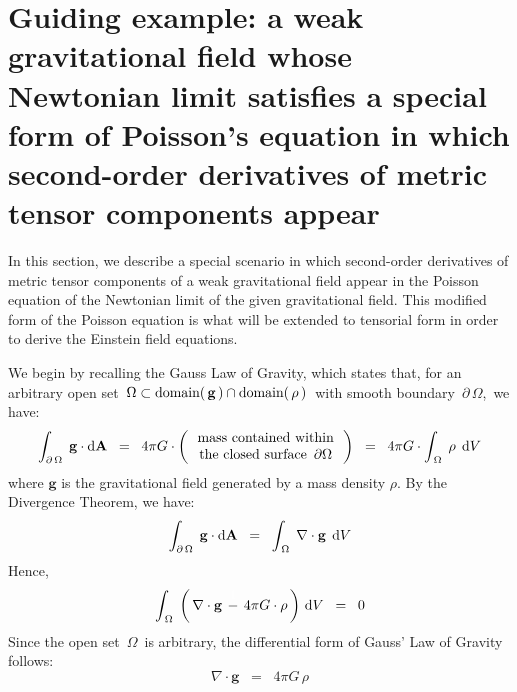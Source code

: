 

\section{Guiding example: a weak gravitational field whose Newtonian limit satisfies a special form of Poisson's equation in which second-order derivatives of metric tensor components appear}
\setcounter{theorem}{0}
\setcounter{equation}{0}


\renewcommand{\theenumi}{\roman{enumi}}
\renewcommand{\labelenumi}{\textnormal{(\theenumi)}$\;\;$}


In this section, we describe a special scenario in which
second-order derivatives of metric tensor components
of a weak gravitational field appear in the Poisson equation
of the Newtonian limit of the given gravitational field.
This modified form of the Poisson equation is what will be
extended to tensorial form in order to derive the Einstein field equations.


\vskip 0.3cm
\noindent
We begin by recalling the Gauss Law of Gravity, which states that,
for an arbitrary open set
\,$\Omega \subset \textnormal{domain}(\,\mathbf{g}\,) \cap \textnormal{domain}(\,\rho\,)$\,
with smooth boundary \,$\partial\,\Omega$,\,
we have:
\begin{equation*}
\int_{\partial\,\Omega}\;\mathbf{g} \cdot \textnormal{d}\mathbf{A}
\;\; = \;\;
	4 \pi G \cdot
	\left(\,
		\begin{array}{c}
		\textnormal{mass contained within}
		\\
		\textnormal{the closed surface \,$\partial\Omega$}
		\end{array}
		\,\right)
\;\; = \;\;
	4 \pi G \cdot
	\int_{\,\Omega}\; \rho \,\;\textnormal{d} V
\end{equation*}
where $\mathbf{g}$ is the gravitational field generated by a mass density  $\rho$.
By the Divergence Theorem, we have:
\begin{equation*}
\int_{\partial\,\Omega}\;\mathbf{g} \cdot \textnormal{d}\mathbf{A}
\;\; = \;\;
	\int_{\,\Omega}\; \nabla \cdot \mathbf{g} \,\;\textnormal{d} V
\end{equation*}
Hence,
\begin{equation*}
\int_{\,\Omega}\;
	\left(\,
		\nabla \cdot \mathbf{g}
		\, \overset{{\color{white}\textnormal{\small1}}}{-} \,
		4 \pi G \cdot \rho
		\,\right)
	\,\d V
\;\; = \;\;
	0
\end{equation*}
Since the open set \,$\Omega$\, is arbitrary, the differential form of Gauss' Law of Gravity follows:
\begin{equation*}
\nabla \cdot \mathbf{g} \;\; = \;\; 4 \pi G \, \rho
\end{equation*}

